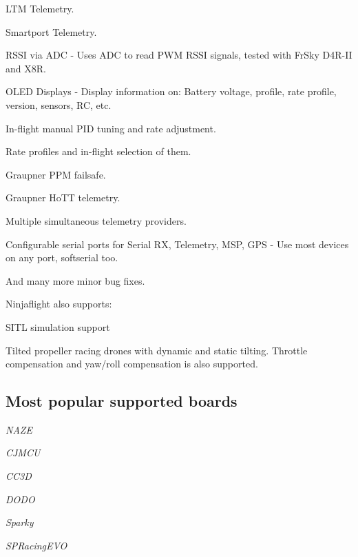 \begin{DoxyItemize}
\item L\+T\+M Telemetry.
\item Smartport Telemetry.
\item R\+S\+S\+I via A\+D\+C -\/ Uses A\+D\+C to read P\+W\+M R\+S\+S\+I signals, tested with Fr\+Sky D4\+R-\/\+I\+I and X8\+R.
\item O\+L\+E\+D Displays -\/ Display information on\+: Battery voltage, profile, rate profile, version, sensors, R\+C, etc.
\item In-\/flight manual P\+I\+D tuning and rate adjustment.
\item Rate profiles and in-\/flight selection of them.
\item Graupner P\+P\+M failsafe.
\item Graupner Ho\+T\+T telemetry.
\item Multiple simultaneous telemetry providers.
\item Configurable serial ports for Serial R\+X, Telemetry, M\+S\+P, G\+P\+S -\/ Use most devices on any port, softserial too.
\item And many more minor bug fixes.
\end{DoxyItemize}

Ninjaflight also supports\+:


\begin{DoxyItemize}
\item S\+I\+T\+L simulation support
\item Tilted propeller racing drones with dynamic and static tilting. Throttle compensation and yaw/roll compensation is also supported.
\end{DoxyItemize}

\subsection*{Most popular supported boards}



{\itshape N\+A\+Z\+E}



{\itshape C\+J\+M\+C\+U}



{\itshape C\+C3\+D}



{\itshape D\+O\+D\+O}



{\itshape Sparky}



{\itshape S\+P\+Racing\+E\+V\+O}



